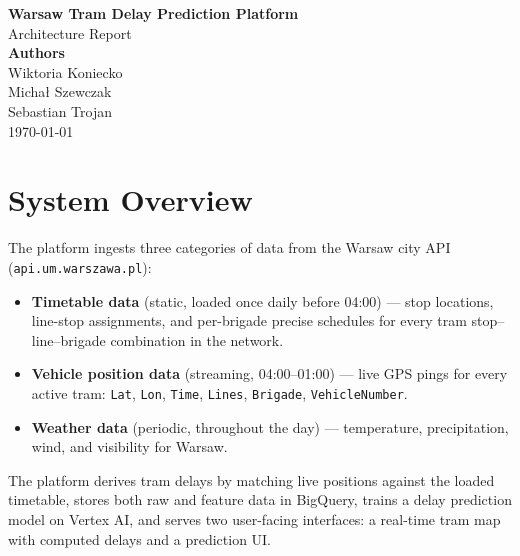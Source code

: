 \documentclass[11pt,a4paper]{article}
\begin{document}
\begin{titlepage}
  \vspace*{2cm}
  \begin{center}
    {\LARGE\bfseries\color{primary}
      Warsaw Tram Delay Prediction Platform}\\[1.2cm]
    {\large\color{textmuted} Architecture Report}\\[0.4cm]
   {\large\bfseries Authors}\\[0.5cm]
    {\normalsize
      Wiktoria Koniecko \\
      Michał Szewczak \\
      Sebastian Trojan
    }\\[2.0cm]

    {\large \today}
  \end{center}
\end{titlepage}

\tableofcontents
\newpage

\section{System Overview}

The platform ingests three categories of data from the Warsaw city API
(\texttt{api.um.warszawa.pl}):

\begin{itemize}[itemsep=3pt]
  \item \textbf{Timetable data} (static, loaded once daily before 04:00) ---
    stop locations, line-stop assignments, and per-brigade precise schedules
    for every tram stop--line--brigade combination in the network.
  \item \textbf{Vehicle position data} (streaming, 04:00--01:00) --- live GPS
    pings for every active tram: \texttt{Lat}, \texttt{Lon}, \texttt{Time},
    \texttt{Lines}, \texttt{Brigade}, \texttt{VehicleNumber}.
  \item \textbf{Weather data} (periodic, throughout the day) --- temperature,
    precipitation, wind, and visibility for Warsaw.
\end{itemize}

The platform derives tram delays by matching live positions against the loaded
timetable, stores both raw and feature data in BigQuery, trains a delay
prediction model on Vertex AI, and serves two user-facing interfaces: a
real-time tram map with computed delays and a prediction UI.
\end{document}
